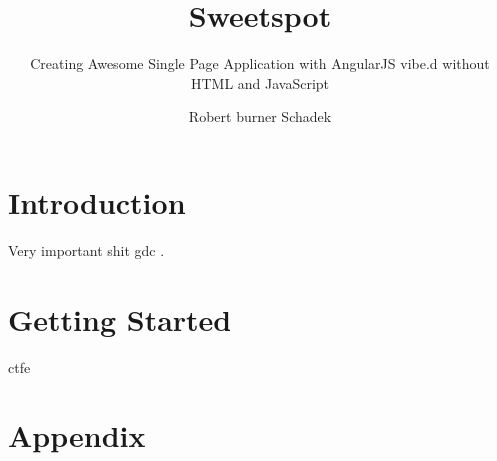 \documentclass[a4paper,openright,BCOR20mm]{scrbook}
\author{Robert burner Schadek}
\title{Sweetspot}
\subtitle{Creating Awesome Single Page Application with AngularJS vibe.d without HTML and JavaScript}
\begin{document}
\maketitle
\tableofcontents

\chapter{Introduction}
Very important shit \gls{gdc} \cite{Alexandrescu:2010}.

\chapter{Getting Started}
\gls{ctfe}

%
%

\chapter*{Appendix}
\appendix
{} \label{appendix}
\cleardoublepage

\label{glossary}
\printnoidxglossary

\cleardoublepage
{}\label{acronyms}
\printnoidxglossary[type=acronym]

\cleardoublepage
{}\label{figures}
\listoffigures
 
\cleardoublepage
{}\label{tables}
\listoftables

\cleardoublepage
{}\label{listings}
\lstlistoflistings

\cleardoublepage
{}\label{bibliography}
%
%
\printbibliography

\end{document}
